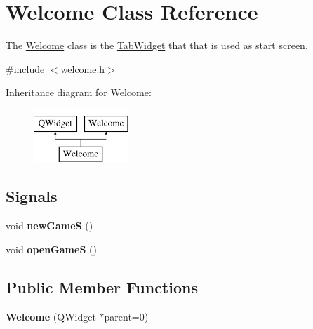 \hypertarget{class_welcome}{\section{\-Welcome \-Class \-Reference}
\label{class_welcome}
}


\-The \hyperlink{class_welcome}{\-Welcome} class is the \hyperlink{class_tab_widget}{\-Tab\-Widget} that that is used as start screen.  




{\ttfamily \#include $<$welcome.\-h$>$}

\-Inheritance diagram for \-Welcome\-:\begin{figure}[H]
\begin{center}
\leavevmode
\includegraphics[height=2.000000cm]{class_welcome}
\end{center}
\end{figure}
\subsection*{\-Signals}
\begin{DoxyCompactItemize}
\item 
\hypertarget{class_welcome_a385d80e086ed72e4e0d3bfd5846a8989}{void {\bfseries new\-Game\-S} ()}\label{class_welcome_a385d80e086ed72e4e0d3bfd5846a8989}

\item 
\hypertarget{class_welcome_a73d0be5b821bc24759131abffabf87f2}{void {\bfseries open\-Game\-S} ()}\label{class_welcome_a73d0be5b821bc24759131abffabf87f2}

\end{DoxyCompactItemize}
\subsection*{\-Public \-Member \-Functions}
\begin{DoxyCompactItemize}
\item 
\hypertarget{class_welcome_acf62624f1107ddc68761d25febbf10ad}{{\bfseries \-Welcome} (\-Q\-Widget $\ast$parent=0)}\label{class_welcome_acf62624f1107ddc68761d25febbf10ad}

\end{DoxyCompactItemize}


